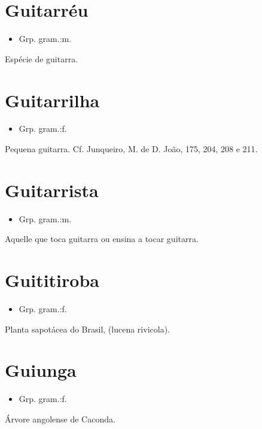 \section{Guitarréu}
\begin{itemize}
\item {Grp. gram.:m.}
\end{itemize}
Espécie de guitarra.
\section{Guitarrilha}
\begin{itemize}
\item {Grp. gram.:f.}
\end{itemize}
Pequena guitarra. Cf. Junqueiro, \textunderscore M. de D. João\textunderscore , 175, 204, 208 e 211.
\section{Guitarrista}
\begin{itemize}
\item {Grp. gram.:m.}
\end{itemize}
Aquelle que toca guitarra ou ensina a tocar guitarra.
\section{Guititiroba}
\begin{itemize}
\item {Grp. gram.:f.}
\end{itemize}
Planta sapotácea do Brasil, (\textunderscore lucena rivicola\textunderscore ).
\section{Guiunga}
\begin{itemize}
\item {Grp. gram.:f.}
\end{itemize}
Árvore angolense de Caconda.
